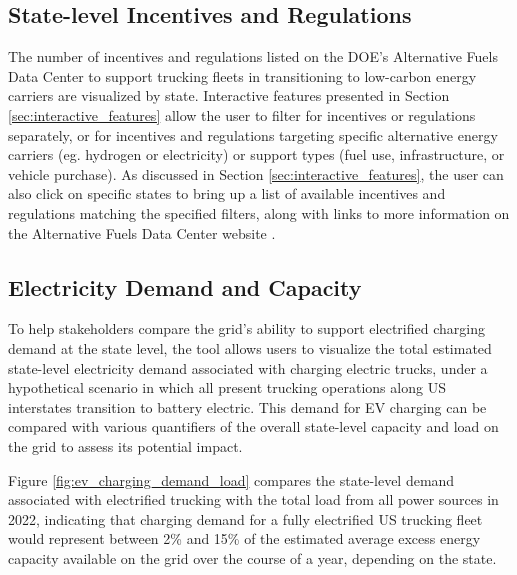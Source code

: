 \subsection{State-level Incentives and Regulations}
\label{sec:state_incentives_and_regulations}

The number of incentives and regulations listed on the DOE's Alternative Fuels Data Center \cite{AFDCLaws} to support trucking fleets in transitioning to low-carbon energy carriers are visualized by state. Interactive features presented in Section \ref{sec:interactive_features} allow the user to filter for incentives or regulations separately, or for incentives and regulations targeting specific alternative energy carriers (eg. hydrogen or electricity) or support types (fuel use, infrastructure, or vehicle purchase). As discussed in Section \ref{sec:interactive_features}, the user can also click on specific states to bring up a list of available incentives and regulations matching the specified filters, along with links to more information on the Alternative Fuels Data Center website \cite{AFDCLaws}.

\subsection{Electricity Demand and Capacity}

To help stakeholders compare the grid's ability to support electrified charging demand at the state level, the tool allows users to visualize the total estimated state-level electricity demand associated with charging electric trucks, under a hypothetical scenario in which all present trucking operations along US interstates transition to battery electric. This demand for EV charging can be compared with various quantifiers of the overall state-level capacity and load on the grid to assess its potential impact. 

Figure \ref{fig:ev_charging_demand_load} compares the state-level demand associated with electrified trucking with the total load from all power sources in 2022, indicating that charging demand for a fully electrified US trucking fleet would represent between 2\% and 15\% of the estimated average excess energy capacity available on the grid over the course of a year, depending on the state. 

